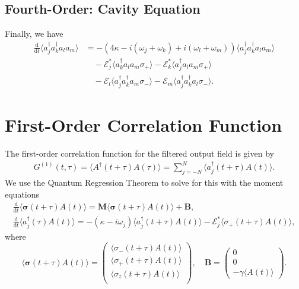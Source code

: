 \documentclass{article}
\newcommand{\ddt}[1][]{\frac{\mathrm{d} #1}{\mathrm{d}t}}
\begin{document}
\subsection{Fourth-Order: Cavity Equation}

Finally, we have
\begin{align}
	\ddt \langle a^{\dagger}_{j} a^{\dagger}_{k} a_{l} a_{m} \rangle &= -\left( 4 \kappa - i \left(\omega_{j} + \omega_{k} \right) + i \left( \omega_{l} + \omega_{m} \right)\right) \langle a^{\dagger}_{j} a^{\dagger}_{k} a_{l} a_{m} \rangle \nonumber \\
	&\quad - \mathcal{E}_{j}^{*} \langle a^{\dagger}_{k} a_{l} a_{m} \sigma_{+} \rangle - \mathcal{E}_{k}^{*} \langle a^{\dagger}_{j} a_{l} a_{m} \sigma_{+} \rangle \nonumber \\
	&\quad - \mathcal{E}_{l} \langle a^{\dagger}_{j} a^{\dagger}_{k} a_{m} \sigma_{-} \rangle - \mathcal{E}_{m} \langle a^{\dagger}_{j} a^{\dagger}_{k} a_{l} \sigma_{-} \rangle.
\end{align}

\section{First-Order Correlation Function}

The first-order correlation function for the filtered output field is given by
\begin{align}
	G^{(1)}(t, \tau) = \langle A^{\dagger}(t + \tau) A(\tau) \rangle = \sum_{j=-N}^{N} \langle a^{\dagger}_{j} (t + \tau) A(t) \rangle.
\end{align}
We use the Quantum Regression Theorem to solve for this with the moment equations
\begin{subequations}
	\begin{gather}
		\ddt \langle \bm{\sigma}(t + \tau) A(t) \rangle = \bm{M} \langle \bm{\sigma}(t + \tau) A(t) \rangle + \bm{B}, \\
		\ddt \langle a^{\dagger}_{j}(\tau) A(t) \rangle = -\left( \kappa - i \omega_{j} \right) \langle a^{\dagger}_{j}(t + \tau) A(t) \rangle - \mathcal{E}_{j}^{*} \langle \sigma_{+}(t + \tau) A(t) \rangle,
	\end{gather}
\end{subequations}
where
\begin{equation}
	\langle \bm{\sigma}(t + \tau) A(t) \rangle = 
	\begin{pmatrix}
		\langle \sigma_{-}(t + \tau) A(t) \rangle \\
		\langle \sigma_{+}(t + \tau) A(t) \rangle \\
		\langle \sigma_{z}(t + \tau) A(t) \rangle \\
	\end{pmatrix}, \quad \bm{B} = 
	\begin{pmatrix}
		0 \\
		0 \\
		-\gamma \langle A(t) \rangle
	\end{pmatrix}.
\end{equation}
\end{document}
